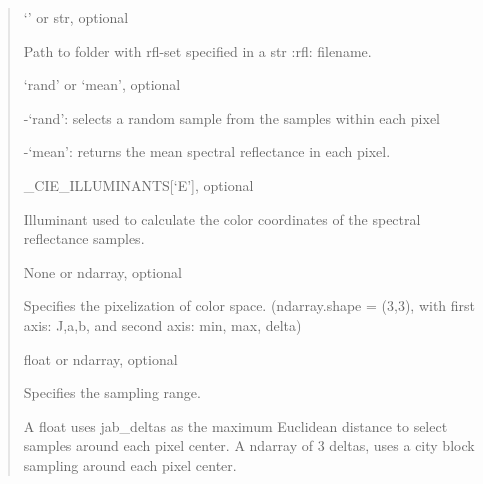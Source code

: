 \documentclass[letterpaper,10pt,english]{sphinxmanual}
\begin{document}
\begin{fulllineitems}
\begin{description}
\begin{quote}
\begin{description}
\item[{rflpath}] \leavevmode
\begin{DUlineblock}{0em}
\item[] ‘’ or str, optional
\item[] Path to folder with rfl-set specified in a str :rfl: filename.
\end{DUlineblock}

\item[{samplefcn}] \leavevmode
\begin{DUlineblock}{0em}
\item[] ‘rand’ or ‘mean’, optional
\item[]
\begin{DUlineblock}{\DUlineblockindent}
\item[] -‘rand’: selects a random sample from the samples within each pixel
\item[] -‘mean’: returns the mean spectral reflectance in each pixel.
\end{DUlineblock}
\end{DUlineblock}

\item[{S}] \leavevmode
\begin{DUlineblock}{0em}
\item[] \_CIE\_ILLUMINANTS{[}‘E’{]}, optional
\item[] Illuminant used to calculate the color coordinates of the spectral 
reflectance samples.
\end{DUlineblock}

\item[{jab\_ranges}] \leavevmode
\begin{DUlineblock}{0em}
\item[] None or ndarray, optional
\item[] Specifies the pixelization of color space.
(ndarray.shape = (3,3), with  first axis: J,a,b, and second 
 axis: min, max, delta)
\end{DUlineblock}

\item[{jab\_deltas}] \leavevmode
\begin{DUlineblock}{0em}
\item[] float or ndarray, optional
\item[] Specifies the sampling range. 
\item[] A float uses jab\_deltas as the maximum Euclidean distance to select
samples around each pixel center. A ndarray of 3 deltas, uses
a city block sampling around each pixel center.
\end{DUlineblock}


\end{description}
\end{quote}
\end{description}
\end{fulllineitems}
\end{document}

